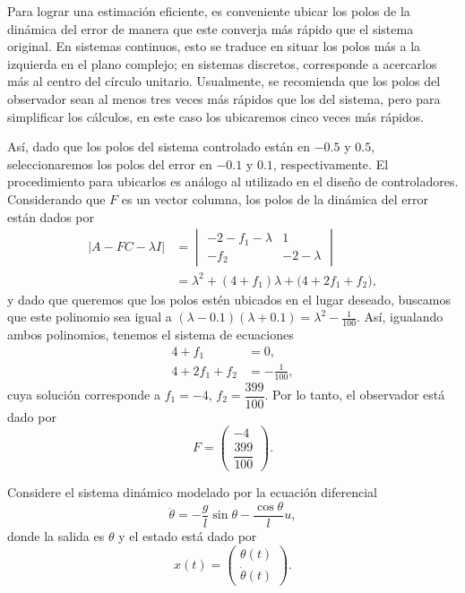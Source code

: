 \documentclass[
  11pt,
  letterpaper,
   addpoints,
  answers
  ]{exam}
\begin{document}
\begin{questions}
\begin{solution}
Para lograr una estimación eficiente, es conveniente ubicar los polos de la dinámica del error de manera que este converja más rápido que el sistema original. En sistemas continuos, esto se traduce en situar los polos más a la izquierda en el plano complejo; en sistemas discretos, corresponde a acercarlos más al centro del círculo unitario. Usualmente, se recomienda que los polos del observador sean al menos tres veces más rápidos que los del sistema, pero para simplificar los cálculos, en este caso los ubicaremos cinco veces más rápidos.

Así, dado que los polos del sistema controlado están en $-0.5$ y $0.5$, seleccionaremos los polos del error en $-0.1$ y $0.1$, respectivamente. El procedimiento para ubicarlos es análogo al utilizado en el diseño de controladores. Considerando que $F$ es un vector columna, los polos de la dinámica del error están dados por
\begin{align}
\lvert A-FC-\lambda I\rvert
&=
\begin{vmatrix}
-2-f_{1}-\lambda & 1\\
-f_{2} & -2-\lambda
\end{vmatrix}\\
&=\lambda^{2}+(4+f_{1})\lambda+\big(4+2f_{1}+f_{2}\big),
\end{align}
y dado que queremos que los polos estén ubicados en el lugar deseado, buscamos que este polinomio sea igual a $(\lambda-0.1)(\lambda+0.1)=\lambda^{2}-\frac{1}{100}$. Así, igualando ambos polinomios, tenemos el sistema de ecuaciones
\begin{align}
4+f_{1}&=0,\\
4+2f_{1}+f_{2}&=-\frac{1}{100},
\end{align}
cuya solución corresponde a $f_{1}=-4$, $f_{2}=\dfrac{399}{100}$. Por lo tanto, el observador está dado por
\begin{equation}
F=\begin{pmatrix}-4\\[4pt] \dfrac{399}{100}\end{pmatrix}.
\end{equation}

\end{solution}
\question Considere el sistema dinámico modelado por la ecuación diferencial
\begin{equation}
    \ddot{\theta} = -\frac{g}{l} \sin \theta - \frac{\cos \theta}{l} u,
\end{equation}
donde la salida es $\theta$ y el estado está dado por
\begin{equation}
    x(t) = \begin{pmatrix} \theta(t) \\ \dot{\theta}(t) \end{pmatrix}.
\end{equation}


\end{questions}
\end{document}
